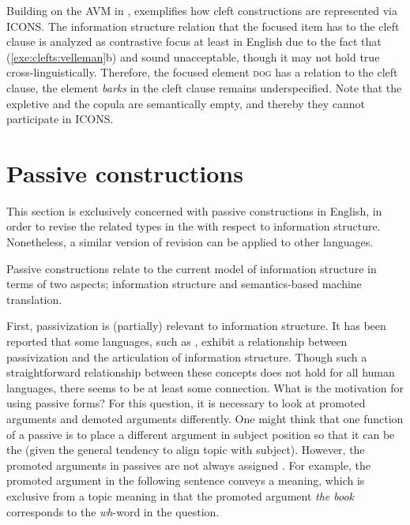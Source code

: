 Building on the AVM in ,
 exemplifies how cleft constructions are represented
via ICONS.  The information structure relation that the focused item
has to the cleft clause is analyzed as contrastive focus at least in
English due to the fact that (\ref{exe:clefts:velleman}b) and
 sound unacceptable, though it may not hold true
cross-linguistically. Therefore, the focused element \textsc{dog} has
a  relation to the cleft clause, the element
\textit{barks} in the cleft clause remains underspecified.  Note that
the expletive \textit{} and the copula \textit{}
are semantically empty, and thereby they cannot participate in ICONS.





\section{Passive constructions}
\label{10:sec:passive}

This section is exclusively concerned with passive constructions in
English, in order to revise the related types in the  with
respect to information structure. Nonetheless, a similar version of
revision can be applied to other languages.


Passive constructions relate to the current model of information
structure in terms of two aspects; information structure and
semantics-based machine translation.


First, passivization is (partially) relevant to information
structure. It has been reported that some languages, such as
 \citep{casielles:03}, exhibit a relationship between
passivization and the articulation of information structure. Though
such a straightforward relationship between these concepts does not
hold for all human languages, there seems to be at least some
connection.  What is the motivation for using passive
forms? For this question, it is necessary to look at
promoted arguments and demoted arguments differently.  One might think
that one function of a passive is to place a different argument in
subject position so that it can be the  (given the general
tendency to align topic with subject). However, the promoted arguments
in passives are not always assigned . For example, the
promoted argument in the following sentence conveys a 
meaning, which is exclusive from a topic meaning in that the promoted
argument \textit{the book} corresponds to the \textit{wh}-word in the
question.


